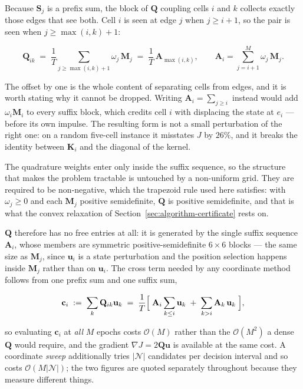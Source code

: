 Because $\mathbf S_j$ is a prefix sum, the block of $\mathbf Q$ coupling cells
$i$ and $k$ collects exactly those edges that see both. Cell $i$ is seen at
edge $j$ when $j\ge i+1$, so the pair is seen when $j\ge\max(i,k)+1$:

\begin{equation}
  \mathbf Q_{ik} \;=\; \frac{1}{T}\!\!\sum_{j\ge\max(i,k)+1}\!\!\omega_j\,
  \mathbf M_j
  \;=\; \frac{1}{T}\,\mathbf A_{\max(i,k)} ,
  \qquad
  \mathbf A_i = \sum_{j= i+1}^{M} \omega_j\,\mathbf M_j .
  \label{eq:Q-structure}
\end{equation}

The offset by one is the whole content of separating cells from edges, and it
is worth stating why it cannot be dropped. Writing $\mathbf A_i=\sum_{j\ge i}$
instead would add $\omega_i\mathbf M_i$ to every suffix block, which credits
cell $i$ with displacing the state at $e_i$ --- before its own impulse. The
resulting form is not a small perturbation of the right one: on a random
five-cell instance it misstates $J$ by $26\%$, and it breaks the identity
between $\mathbf K_i$ and the diagonal of the kernel.

The quadrature weights enter only inside the suffix sequence, so the structure
that makes the problem tractable is untouched by a non-uniform grid. They are
required to be non-negative, which the trapezoid rule used here satisfies:
with $\omega_j\ge0$ and each
$\mathbf M_j$ positive semidefinite, $\mathbf Q$ is positive semidefinite, and
that is what the convex relaxation of Section~\ref{sec:algorithm-certificate}
rests on.

$\mathbf Q$ therefore has no free entries at all: it is generated by the single
suffix sequence $\mathbf A_i$, whose members are symmetric positive-semidefinite
$6\times6$ blocks --- the same size as $\mathbf M_j$, since $\mathbf u_i$ is a
state perturbation and the position selection happens inside $\mathbf M_j$
rather than on $\mathbf u_i$. The cross term needed by any coordinate method
follows from one prefix sum and one suffix sum,

\begin{equation}
  \mathbf c_i \;:=\; \sum_{k}\mathbf Q_{ik}\mathbf u_k
  \;=\; \frac{1}{T}\Bigl[\;
    \mathbf A_i \sum_{k\le i}\mathbf u_k
    \;+\; \sum_{k>i}\mathbf A_k\,\mathbf u_k
  \;\Bigr] ,
  \label{eq:cross-term}
\end{equation}

so evaluating $\mathbf c_i$ at \emph{all} $M$ epochs costs $\mathcal{O}(M)$
rather than the $\mathcal{O}(M^2)$ a dense $\mathbf Q$ would require, and the
gradient $\nabla J = 2\mathbf Q\mathbf u$ is available at the same cost. A
coordinate \emph{sweep} additionally tries $\lvert\mathcal{N}\rvert$ candidates
per decision interval and so costs
$\mathcal{O}(M\lvert\mathcal{N}\rvert)$; the two figures are quoted separately
throughout because they measure different things.

